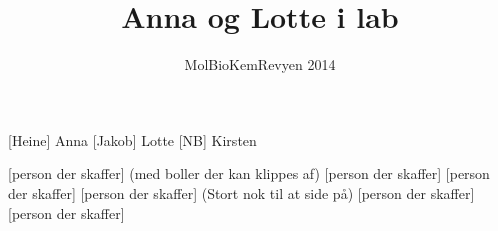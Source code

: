 \documentclass[a4paper,11pt]{article}
\title{Anna og Lotte i lab}
\author{MolBioKemRevyen 2014}
\begin{document}
\maketitle

\begin{roles}
    [Heine] Anna
    [Jakob] Lotte
    [NB] Kirsten
\end{roles}

\begin{props}
    [person der skaffer] (med boller der kan klippes af)
    [person der skaffer]
    [person der skaffer]
    [person der skaffer] (Stort nok til at side på)
    [person der skaffer]
    [person der skaffer]
\end{props}
\end{document}
